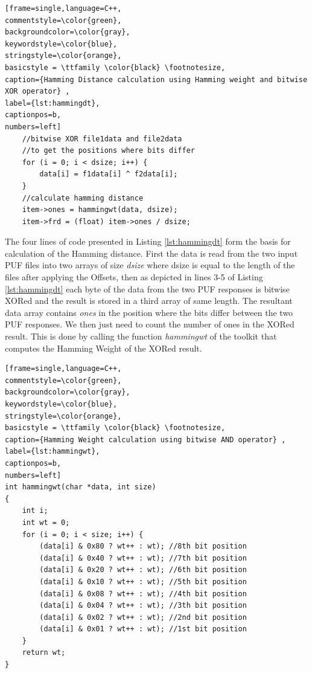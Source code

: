 \begin{center}
\begin{minipage}{0.7\textwidth}
\begin{lstlisting}[frame=single,language=C++,
commentstyle=\color{green},
backgroundcolor=\color{gray},
keywordstyle=\color{blue},
stringstyle=\color{orange},
basicstyle = \ttfamily \color{black} \footnotesize,
caption={Hamming Distance calculation using Hamming weight and bitwise XOR operator} ,
label={lst:hammingdt},
captionpos=b,
numbers=left]
    //bitwise XOR file1data and file2data
    //to get the positions where bits differ
    for (i = 0; i < dsize; i++) {
        data[i] = f1data[i] ^ f2data[i];
    }
    //calculate hamming distance
    item->ones = hammingwt(data, dsize);
    item->frd = (float) item->ones / dsize;
\end{lstlisting}
\end{minipage}
\end{center}

The four lines of code presented in Listing \ref{lst:hammingdt} form the basis for calculation of the Hamming distance. First the data is read from the two input PUF files into two arrays of size \emph{dsize} where dsize is equal to the length of the files after applying the Offsets, then as depicted in lines 3-5 of Listing \ref{lst:hammingdt} each byte of the data from the two PUF responses is bitwise XORed and the result is stored in a third array of same length. The resultant data array contains
\emph{ones} in the position where the bits differ between the two PUF responses. We then just need to count the number of ones in the XORed result.
This is done by calling the function \emph{hammingwt} of the toolkit that computes the Hamming Weight of the XORed result.\\

\begin{center}
\begin{minipage}{0.7\textwidth}
\begin{lstlisting}[frame=single,language=C++,
commentstyle=\color{green},
backgroundcolor=\color{gray},
keywordstyle=\color{blue},
stringstyle=\color{orange},
basicstyle = \ttfamily \color{black} \footnotesize,
caption={Hamming Weight calculation using bitwise AND operator} ,
label={lst:hammingwt},
captionpos=b,
numbers=left]
int hammingwt(char *data, int size)
{
    int i;
    int wt = 0;
    for (i = 0; i < size; i++) {
        (data[i] & 0x80 ? wt++ : wt); //8th bit position
        (data[i] & 0x40 ? wt++ : wt); //7th bit position
        (data[i] & 0x20 ? wt++ : wt); //6th bit position
        (data[i] & 0x10 ? wt++ : wt); //5th bit position
        (data[i] & 0x08 ? wt++ : wt); //4th bit position
        (data[i] & 0x04 ? wt++ : wt); //3th bit position
        (data[i] & 0x02 ? wt++ : wt); //2nd bit position
        (data[i] & 0x01 ? wt++ : wt); //1st bit position
    }
    return wt;
}
\end{lstlisting}
\end{minipage}
\end{center}

